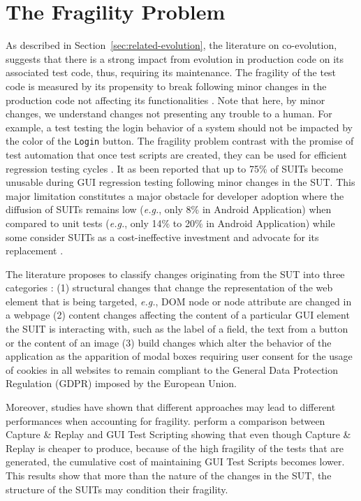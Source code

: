 \section{The Fragility Problem}
\label{sec:related-fragility}

As described in Section~\ref{sec:related-evolution}, the literature on co-evolution, suggests that there is a strong impact from evolution in production code on its associated test code, thus, requiring its maintenance. The fragility of the test code is measured by its propensity to break following minor changes in the production code not affecting its functionalities \cite{Garousi2016, Coppola2019}. Note that here, by minor changes, we understand changes not presenting any trouble to a human. For example, a test testing the login behavior of a system should not be impacted by the color of the \texttt{Login} button. The fragility problem contrast with the promise of test automation that once test scripts are created, they can be used for efficient regression testing cycles \cite{Yandrapally2014}.  It as been reported that up to 75\% of SUITs become unusable during GUI regression testing \cite{Memon2003a, Grechanik2009} following minor changes in the SUT. This major limitation constitutes a major obstacle for developer adoption where the diffusion of SUITs remains low (\emph{e.g.}, only 8\% \cite{Coppola2017, Coppola2019b} in Android Application) when compared to unit tests (\emph{e.g.}, only 14\% \cite{Kochhar2015} to 20\% \cite{Coppola2017, Coppola2019b} in Android Application) while some consider SUITs as a cost-ineffective investment and advocate for its replacement \cite{Vliegendhart2012, Chen2020}.

The literature proposes to classify changes originating from the SUT into three categories \cite{Choudhary2011, Yandrapally2014, Coppola2016}: (1) structural changes that change the representation of the web element that is being targeted, \emph{e.g.}, DOM node or node attribute are changed in a webpage (2) content changes affecting the content of a particular GUI element the SUIT is interacting with, such as the label of a field, the text from a button or the content of an image (3) build changes which alter the behavior of the application as the apparition of modal boxes requiring user consent for the usage of cookies in all websites to remain compliant to the General Data Protection Regulation (GDPR) imposed by the European Union.

Moreover, studies have shown that different approaches may lead to different performances when accounting for fragility. \textcite{Leotta2013, Leotta2014} perform a comparison between Capture \& Replay and GUI Test Scripting showing that even though Capture \& Replay is cheaper to produce, because of the high fragility of the tests that are generated, the cumulative cost of maintaining GUI Test Scripts becomes lower. This results show that more than the nature of the changes in the SUT, the structure of the SUITs may condition their fragility. 

